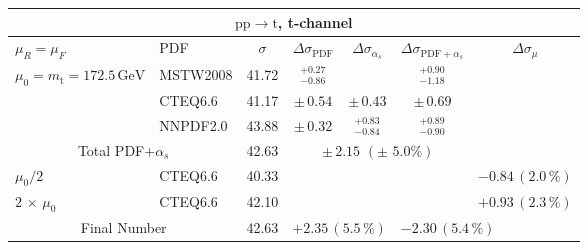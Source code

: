 \begin{table}[htb]
  \begin{center}
    \begin{tabular}{|l|l|c|c|c|c|c|}
      \hline

      \multicolumn{7}{|c|}{$\mathrm{pp}\to\mathrm{t}$, t-channel} \\ \hline
      $\mu_R=\mu_F$ & PDF & $\sigma$ & $\Delta\sigma_{\mathrm{PDF}}$ & $\Delta\sigma_{\alpha_s}$ & $\Delta\sigma_{\mathrm{PDF}+\alpha_s}$ & $\Delta\sigma_{\mu}$ \\ \hline\hline

      $\mu_0=m_\mathrm{t}=172.5\,\mathrm{GeV}$ & MSTW2008 & 41.72 & $^{+0.27}_{-0.86}$ &     &  $^{+0.90}_{-1.18}$    &     \\
                                                & CTEQ6.6  & 41.17 & $\pm\,0.54$ &  $\pm\,0.43$  &  $\pm\,0.69$       &     \\
                                                & NNPDF2.0 & 43.88 & $\pm\,0.32$ &  $^{+0.83}_{-0.84}$  & $^{+0.89}_{-0.90}$     &     \\ \hline\hline
      \multicolumn{2}{|c|}{Total PDF+$\alpha_s$}      &  42.63   & \multicolumn{3}{c|}{$\pm\,2.15\,\,(\pm\,\,5.0\%)$} & \\ \hline\hline
      $\mu_0/2$                                 & CTEQ6.6 & 40.33 & \multicolumn{3}{c|}{} & $-0.84\,(2.0\,\%)$ \\ 
      $2\,\times\,\mu_0$                        & CTEQ6.6 & 42.10 & \multicolumn{3}{c|}{} & $+0.93\,(2.3\,\%)$ \\  \hline\hline
      \multicolumn{2}{|c|}{Final Number} & 42.63  & \multicolumn{2}{l}{$+2.35\,(5.5\,\%)$} & \multicolumn{2}{l|}{$-2.30\,(5.4\,\%)$} \\


\hline 
\end{tabular}
\end{center}
\end{table} 



